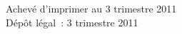\cleardoublepage
\mbox{}
\vfill

{\scriptsize
\begin{center}
Achevé d'imprimer au 3 trimestre 2011 \\
Dépôt légal~: 3 trimestre 2011
\end{center}
}
\enlargethispage{\footskip}


